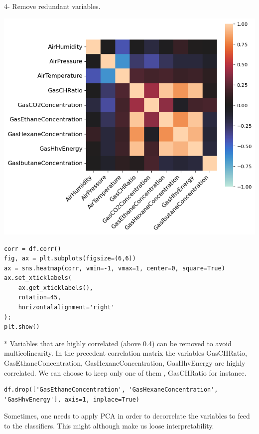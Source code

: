 \documentclass[24pt]{article}
\begin{document}
4- Remove redundant variables.

\begin{center}
\includegraphics[scale = 0.6]{correlated_variables.png}
\end{center}


\begin{lstlisting}
corr = df.corr()
fig, ax = plt.subplots(figsize=(6,6))         
ax = sns.heatmap(corr, vmin=-1, vmax=1, center=0, square=True)
ax.set_xticklabels(
    ax.get_xticklabels(),
    rotation=45,
    horizontalalignment='right'
);
plt.show()
\end{lstlisting}






* Variables that are highly correlated (above 0.4) can be removed to avoid multicolinearity.
In the precedent correlation matrix the variables GasCHRatio, GasEthaneConcentration, GasHexaneConcentration,
GasHhvEnergy are highly correlated. We can choose to keep only one of them , GasCHRatio for instance.

\begin{lstlisting}
df.drop(['GasEthaneConcentration', 'GasHexaneConcentration',
'GasHhvEnergy'], axis=1, inplace=True)
\end{lstlisting}

  Sometimes, one needs to apply PCA in order to decorrelate the variables to feed to the classifiers. This might although make us loose interpretability.
 
\end{document}
